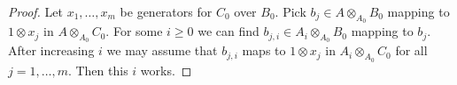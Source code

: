 \documentclass[10pt,a4paper]{amsart}
\theoremstyle{plain}
\theoremstyle{definition}
\theoremstyle{remark}
\numberwithin{equation}{subsection}
\begin{document}
\begin{proof}
Let $x_1, \ldots, x_m$ be generators for $C_0$ over $B_0$.
Pick $b_j \in A \otimes_{A_0} B_0$ mapping to $1 \otimes x_j$ in
$A \otimes_{A_0} C_0$. For some $i \geq 0$ we can find
$b_{j, i} \in A_i \otimes_{A_0} B_0$ mapping to $b_j$.
After increasing $i$ we may assume that $b_{j, i}$ maps
to $1 \otimes x_j$ in $A_i \otimes_{A_0} C_0$ for all $j = 1, \ldots, m$.
Then this $i$ works.
\end{proof}
\end{document}
